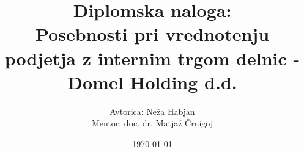 \documentclass{article}
\begin{document}
\title{Diplomska naloga:\\
\textbf{Posebnosti pri vrednotenju podjetja z internim trgom delnic - Domel Holding d.d.} }

\author{Avtorica: Neža Habjan\\
Mentor: doc. dr. Matjaž Črnigoj}
\date{\today}

\maketitle
\end{document}
